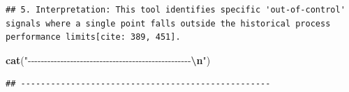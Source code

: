 \documentclass[
]{article}
\newenvironment{Shaded}{\begin{snugshade}}{\end{snugshade}}
\newcommand{\FunctionTok}[1]{\textcolor[rgb]{0.13,0.29,0.53}{\textbf{#1}}}
\newcommand{\NormalTok}[1]{#1}
\newcommand{\SpecialCharTok}[1]{\textcolor[rgb]{0.81,0.36,0.00}{\textbf{#1}}}
\newcommand{\StringTok}[1]{\textcolor[rgb]{0.31,0.60,0.02}{#1}}
\begin{document}
\begin{verbatim}
## 5. Interpretation: This tool identifies specific 'out-of-control' signals where a single point falls outside the historical process performance limits[cite: 389, 451].
\end{verbatim}

\begin{Shaded}
\begin{Highlighting}[]
\FunctionTok{cat}\NormalTok{(}\StringTok{"{-}{-}{-}{-}{-}{-}{-}{-}{-}{-}{-}{-}{-}{-}{-}{-}{-}{-}{-}{-}{-}{-}{-}{-}{-}{-}{-}{-}{-}{-}{-}{-}{-}{-}{-}{-}{-}{-}{-}{-}{-}{-}{-}{-}{-}{-}{-}{-}{-}{-}}\SpecialCharTok{\textbackslash{}n}\StringTok{"}\NormalTok{)}
\end{Highlighting}
\end{Shaded}

\begin{verbatim}
## --------------------------------------------------
\end{verbatim}
\end{document}
